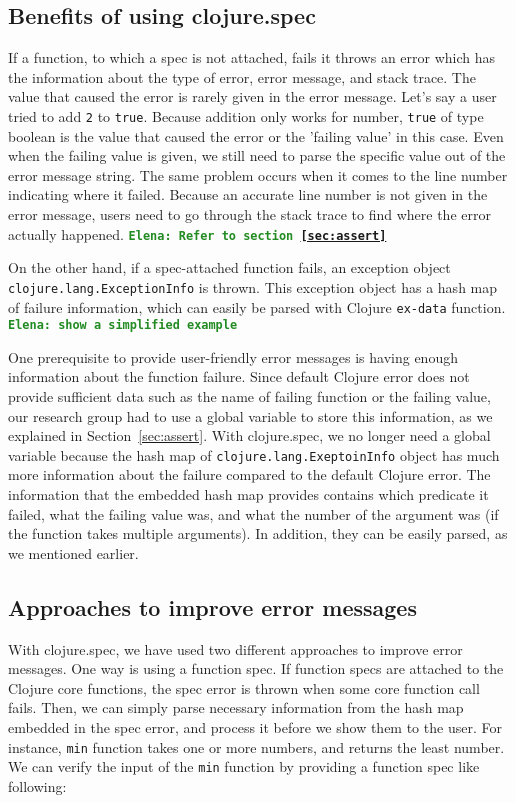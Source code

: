 \documentclass[12pt]{article}
\newcommand{\comment}[1]{{\bf \tt  {#1}}}
\newcommand{\emcomment}[1]{\textcolor{ForestGreen}{\comment{Elena: {#1}}}}
\begin{document}
	\subsection{Benefits of using clojure.spec}
	If a function, to which a spec is not attached, fails 
	it throws an error which has the information about the type of error, error message, and stack 
	trace. The value that caused the error is rarely given in the error message.
	Let's say a user tried to add {\tt 2} to {\tt true}. Because addition only works for number, 
	{\tt true} of type boolean is the value that caused the error or the 'failing value' in this case.
	Even when the failing value is given, we still need to parse the specific value out of 
	the error message string. The same problem occurs when it comes to the line number indicating where it failed. 
	Because an accurate line number is not given in the error message, users need to go through the stack trace to find 
	where the error actually happened. 
	\emcomment{Refer to section~\ref{sec:assert}}

	On the other hand, if a spec-attached function fails, an exception object 
	\newline	
	{\tt clojure.lang.ExceptionInfo} is thrown. 
	This exception object has a hash map of failure information, which can easily be 
	parsed with Clojure {\tt ex-data} function. 
	\emcomment{show a simplified example}

	One prerequisite to provide user-friendly error messages is having enough information about the function failure. Since 
	default Clojure error does not provide sufficient data such as the name of failing function or the failing value, our 
	research group had to use a global variable to store this information, as we explained in Section~\ref{sec:assert}. 
	With clojure.spec, we no longer need a global variable because the hash map of {\tt clojure.lang.ExeptoinInfo} object 
	has much more information about the 
	failure compared to the default Clojure error. The information that the embedded hash map provides contains which predicate it 
	failed, what the failing value was, and what the number of the argument was (if the function takes multiple arguments). 
	In addition, they can be easily parsed, as we mentioned earlier.
	
	\subsection{Approaches to improve error messages}
	With clojure.spec, we have used two different approaches to improve error messages. One way is using a function spec. 
	If function specs are attached to the Clojure core functions, the spec error is thrown when some core function 
	call fails. Then, we can simply parse necessary information from the hash map embedded in the spec error, and 
	process it before we show them to the user. For instance, {\tt min} function 
	takes one or more numbers, and returns the least number. We can verify the input of the {\tt min} function by providing a 
	function spec like following:
\end{document}
